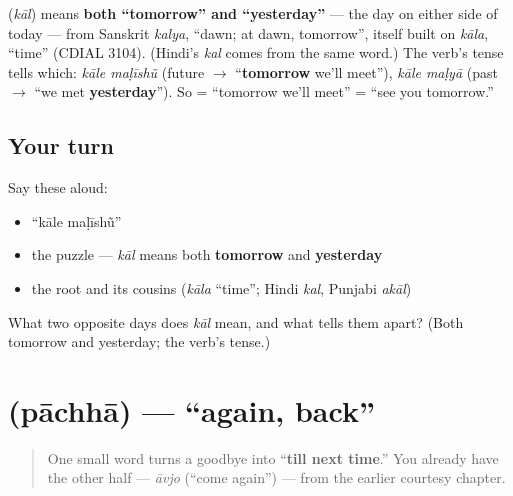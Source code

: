 \begin{cousinweb}
\textbf{} (\emph{kāl}) means \textbf{both \textquotedblleft{}tomorrow\textquotedblright{} and \textquotedblleft{}yesterday\textquotedblright{}} — the day on either side of today — from Sanskrit \emph{kalya}, \textquotedblleft{}dawn; at dawn, tomorrow\textquotedblright{}, itself built on \emph{kāla}, \textquotedblleft{}time\textquotedblright{} (CDIAL 3104). (Hindi's \emph{kal} comes from the same word.) The verb's tense tells which: \emph{kāle maḷīshũ} (future $\to$ \textquotedblleft{}\textbf{tomorrow} we'll meet\textquotedblright{}), \emph{kāle maḷyā} (past $\to$ \textquotedblleft{}we met \textbf{yesterday}\textquotedblright{}). So \textbf{ } = \textquotedblleft{}tomorrow we'll meet\textquotedblright{} = \textquotedblleft{}see you tomorrow.\textquotedblright{}
\end{cousinweb}

\subsection*{Your turn}
Say these aloud:

\begin{itemize}
\raggedright
  \item \textquotedblleft{}kāle maḷīshũ\textquotedblright{}
  \item the puzzle — \emph{kāl} means both \textbf{tomorrow} and \textbf{yesterday}
  \item the root and its cousins (\emph{kāla} \textquotedblleft{}time\textquotedblright{}; Hindi \emph{kal}, Punjabi \emph{akāl})
\end{itemize}

\begin{tcolorbox}[breakable,colback=teal!4,colframe=teal!35!black,title={Before you move on}]
What two opposite days does \emph{kāl} mean, and what tells them apart? (Both tomorrow and yesterday; the verb's tense.)
\end{tcolorbox}
\section[\texorpdfstring{\gu{પાછા} (pāchhā)}{પાછા (pāchhā)}]{ (pāchhā) — \textquotedblleft{}again, back\textquotedblright{}}

\label{lesson:GU-C04-pachha}



\begin{quote}
One small word turns a goodbye into \textquotedblleft{}\textbf{till next time}.\textquotedblright{} You already have the other half — \emph{āvjo} (\textquotedblleft{}come again\textquotedblright{}) — from the earlier courtesy chapter.
\end{quote}

